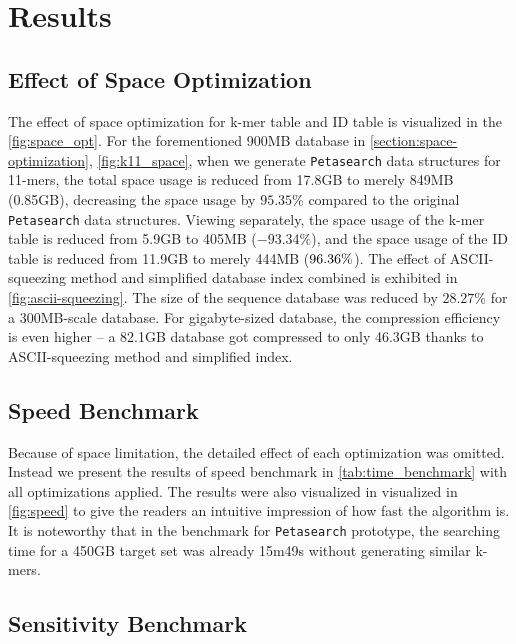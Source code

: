 \chapter{Results} \label{chapter:results}


\section{Effect of Space Optimization}

The effect of space optimization for k-mer table and ID table is visualized in the \autoref{fig:space_opt}.
For the forementioned 900MB database in \cref{section:space-optimization}, \autoref{fig:k11_space}, when we generate \texttt{Petasearch} data structures for 11-mers, the total space usage is reduced from 17.8GB to merely 849MB (0.85GB), decreasing the space usage by $95.35\%$ compared to the original \texttt{Petasearch} data structures.
Viewing separately, the space usage of the k-mer table is reduced from 5.9GB to 405MB ($-93.34\%$), and the space usage of the ID table is reduced from 11.9GB to merely 444MB ($\-96.36\%$).
The effect of ASCII-squeezing method and simplified database index combined is exhibited in \autoref{fig:ascii-squeezing}.
The size of the sequence database was reduced by $28.27 \%$ for a 300MB-scale database.
For gigabyte-sized database, the compression efficiency is even higher -- a 82.1GB database got compressed to only 46.3GB thanks to ASCII-squeezing method and simplified index.

\section{Speed Benchmark}

Because of space limitation, the detailed effect of each optimization was omitted. Instead we present the results of speed benchmark in \autoref{tab:time_benchmark} with all optimizations applied. The results were also visualized in visualized in \autoref{fig:speed} to give the readers an intuitive impression of how fast the algorithm is. It is noteworthy that in the benchmark for \texttt{Petasearch} prototype, the searching time for a 450GB target set was already 15m49s without generating similar k-mers.

\section{Sensitivity Benchmark}

